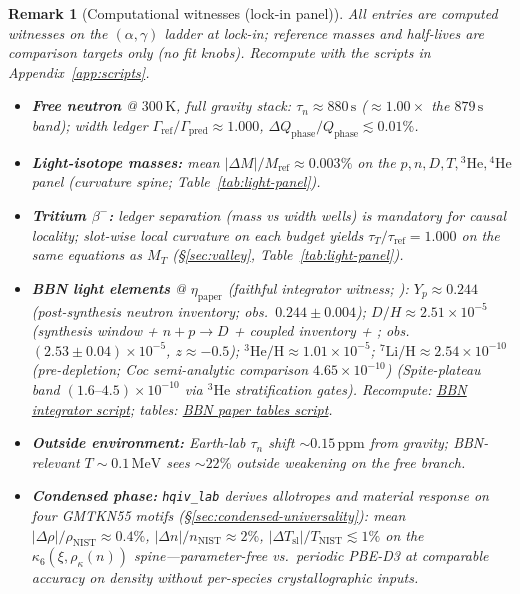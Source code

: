 \documentclass[11pt,notitlepage]{amsart}
\newcommand{\leanid}[1]{{\footnotesize\path{#1}}}
\newtheorem{remark}[theorem]{Remark}
\begin{document}
\begin{remark}[Computational witnesses (lock-in panel)]
\label{sec:computational-witnesses}
All entries are \emph{computed witnesses} on the $(\alpha,\gamma)$ ladder at lock-in;
reference masses and half-lives are comparison targets only (no fit knobs).
Recompute with the scripts in Appendix~\ref{app:scripts}.
\begin{itemize}[leftmargin=1.5em]
\item \textbf{Free neutron} @ $300\,\mathrm{K}$, full gravity stack:
  $\tau_n\approx 880\,\mathrm{s}$ ($\approx 1.00\times$ the $879\,\mathrm{s}$ band);
  width ledger $\Gamma_{\mathrm{ref}}/\Gamma_{\mathrm{pred}}\approx 1.000$,
  $\Delta Q_{\mathrm{phase}}/Q_{\mathrm{phase}}\lesssim 0.01\%$.
\item \textbf{Light-isotope masses:} mean $|\Delta M|/M_{\mathrm{ref}}\approx 0.003\%$
  on the $p,n,D,T,{}^3\mathrm{He},{}^4\mathrm{He}$ panel (curvature spine;
  Table~\ref{tab:light-panel}).
\item \textbf{Tritium $\beta^-$:} ledger separation (mass vs width wells) is mandatory
  for causal locality; slot-wise local curvature on each budget yields
  $\tau_T/\tau_{\mathrm{ref}}=1.000$ on the same equations as $M_T$
  (\S\ref{sec:valley}, Table~\ref{tab:light-panel}).
\item \textbf{BBN light elements} @ $\eta_{\mathrm{paper}}$ (faithful integrator witness;
  \cite{hqiv-bbn-paper}): $Y_p\approx 0.244$ (post-synthesis neutron inventory;
  obs.\ $0.244\pm0.004$); $D/H\approx 2.51\times 10^{-5}$ (synthesis window +
  $n\!+\!p\!\to\!D$ + coupled inventory + \leanid{bbnSynthesisDWindowTailGate};
  obs.\ $(2.53\pm0.04)\times 10^{-5}$, $z\approx -0.5$);
  $^3\mathrm{He}/\mathrm{H}\approx 1.01\times 10^{-5}$; $^7\mathrm{Li}/\mathrm{H}\approx 2.54\times 10^{-10}$
  (pre-depletion; Coc semi-analytic comparison $4.65\times 10^{-10}$)
  (Spite-plateau band $(1.6\text{--}4.5)\times 10^{-10}$ via $^3\mathrm{He}$ stratification gates).
  Recompute: \hyperref[app:scripts]{BBN integrator script}; tables: \hyperref[app:scripts]{BBN paper tables script}.
\item \textbf{Outside environment:} Earth-lab $\tau_n$ shift $\sim 0.15\,\mathrm{ppm}$
  from gravity; BBN-relevant $T\sim 0.1\,\mathrm{MeV}$ sees $\sim 22\%$ outside
  weakening on the free branch.
\item \textbf{Condensed phase:} \texttt{hqiv\_lab} derives allotropes and material response on
  four GMTKN55 motifs (\S\ref{sec:condensed-universality}): mean $|\Delta\rho|/\rho_{\mathrm{NIST}}\approx 0.4\%$,
  $|\Delta n|/n_{\mathrm{NIST}}\approx 2\%$, $|\Delta T_{\mathrm{sl}}|/T_{\mathrm{NIST}}\lesssim 1\%$
  on the $\kappa_6(\xi,\rho_\kappa(n))$ spine---parameter-free vs.\ periodic PBE-D3
  \cite{grimme2011d3,santra2013ice,brandenburg2016jctc} at comparable accuracy on density
  without per-species crystallographic inputs.
\end{itemize}
\end{remark}
\end{document}
